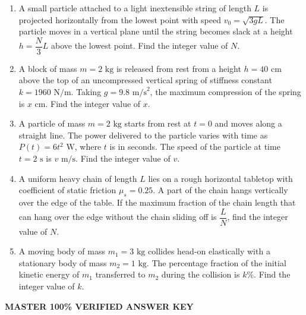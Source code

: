 \documentclass[11pt,a4paper]{article}
\begin{document}
\begin{enumerate}[label=\textbf{\arabic*.},leftmargin=18pt,itemsep=12pt,resume]

  \item A small particle attached to a light inextensible string of length $L$ is projected horizontally from the lowest point with speed $v_0 = \sqrt{3gL}$. The particle moves in a vertical plane until the string becomes slack at a height $h = \dfrac{N}{3}L$ above the lowest point. Find the integer value of $N$.

  \item A block of mass $m = 2\text{ kg}$ is released from rest from a height $h = 40\text{ cm}$ above the top of an uncompressed vertical spring of stiffness constant $k = 1960\text{ N/m}$. Taking $g = 9.8\text{ m/s}^2$, the maximum compression of the spring is $x\text{ cm}$. Find the integer value of $x$.

  \item A particle of mass $m = 2\text{ kg}$ starts from rest at $t = 0$ and moves along a straight line. The power delivered to the particle varies with time as $P(t) = 6t^2\text{ W}$, where $t$ is in seconds. The speed of the particle at time $t = 2\text{ s}$ is $v\text{ m/s}$. Find the integer value of $v$.

  \item A uniform heavy chain of length $L$ lies on a rough horizontal tabletop with coefficient of static friction $\mu_s = 0.25$. A part of the chain hangs vertically over the edge of the table. If the maximum fraction of the chain length that can hang over the edge without the chain sliding off is $\dfrac{L}{N}$, find the integer value of $N$.

  \item A moving body of mass $m_1 = 3\text{ kg}$ collides head-on elastically with a stationary body of mass $m_2 = 1\text{ kg}$. The percentage fraction of the initial kinetic energy of $m_1$ transferred to $m_2$ during the collision is $k\%$. Find the integer value of $k$.

\end{enumerate}

\newpage

\begin{tcolorbox}[sectionbanner]
  {\large \textbf{\textsf{MASTER 100\% VERIFIED ANSWER KEY}}}
\end{tcolorbox}
\vspace{4pt}
\end{document}
